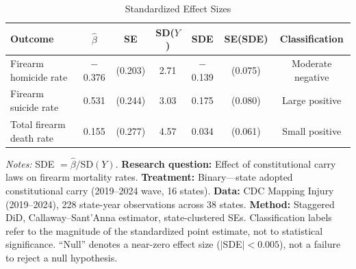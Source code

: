 \begin{table}[H]
\centering
\caption{Standardized Effect Sizes}
\label{tab:sde}
\begin{tabular}{lcccccc}
\toprule
Outcome & $\hat{\beta}$ & SE & SD($Y$) & SDE & SE(SDE) & Classification \\
\midrule
Firearm homicide rate & $-$0.376 & (0.203) & 2.71 & $-$0.139 & (0.075) & Moderate negative \\
Firearm suicide rate & 0.531 & (0.244) & 3.03 & 0.175 & (0.080) & Large positive \\
Total firearm death rate & 0.155 & (0.277) & 4.57 & 0.034 & (0.061) & Small positive \\
\bottomrule
\end{tabular}
\par\vspace{0.3em}
{\footnotesize \emph{Notes:} SDE $= \hat{\beta} / \text{SD}(Y)$. \textbf{Research question:} Effect of constitutional carry laws on firearm mortality rates. \textbf{Treatment:} Binary---state adopted constitutional carry (2019--2024 wave, 16 states). \textbf{Data:} CDC Mapping Injury (2019--2024), 228 state-year observations across 38 states. \textbf{Method:} Staggered DiD, Callaway--Sant'Anna estimator, state-clustered SEs. Classification labels refer to the magnitude of the standardized point estimate, not to statistical significance. ``Null'' denotes a near-zero effect size ($|$SDE$| < 0.005$), not a failure to reject a null hypothesis.}
\end{table}
